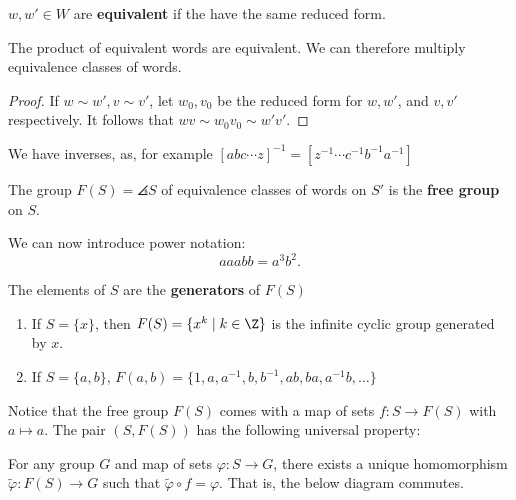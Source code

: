 \begin{defn}
    $w,w'\in W$ are \textbf{equivalent} if the have the same reduced form.
\end{defn}

\begin{prop}
    The product of equivalent words are equivalent. We can therefore multiply equivalence classes of words.
\end{prop}

\begin{proof}
    If $w \sim w',v \sim v'$, let $w_0,v_0$ be the reduced form for $w,w'$, and $v,v'$ respectively. It follows that $wv \sim w_0v_0 \sim w'v'$.
\end{proof}

\begin{rmk}
    We have inverses, as, for example $[abc\cdots z]^{-1}=[z^{-1}\cdots c^{-1}b^{-1}a^{-1}]$
\end{rmk}

\begin{defn}
    The group $F(S) = \angles{S}$ of equivalence classes of words on $S'$ is the \textbf{free group} on $S$.
\end{defn}

We can now introduce power notation:
$$aaabb=a^3b^2.$$
\begin{defn}
    The elements of $S$ are the \textbf{generators} of $F(S)$
\end{defn}

\begin{ex}
    \begin{enumerate}
        \item If $S= \{x\}$, then $F(S) = \{x^k \mid k \in \Z\}$ is the infinite cyclic group generated by $x$.
        \item If $S = \{a,b\}$, $F(a,b) = \{1,a,a^{-1},b,b^{-1},ab,ba,a^{-1}b,\dots\}$
    \end{enumerate}
\end{ex}

\begin{thm}
    Notice that the free group $F(S)$ comes with a map of sets $f:S \to F(S)$ with $a \mapsto a$. The pair $(S,F(S))$ has the following universal property:

    For any group $G$ and map of sets $\varphi:S \to G$, there exists a unique homomorphism $\tilde \varphi :F(S) \to G$ such that $\tilde \varphi \circ f = \varphi$. That is, the below diagram commutes.
\end{thm}

